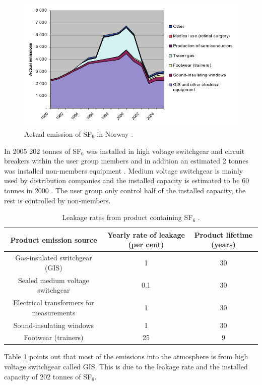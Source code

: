 \documentclass[10pt,a4paper]{article} %
\begin{document}
\begin{figure}[H]
\centering
\includegraphics[scale=0.6]{Bilder/Theory/emissionsSF6Norway.png}
\caption{Actual emission of SF$_6$ in Norway \cite{bib:StatSF6}.} \label{fig:SF6EmissNor}
\end{figure}

In 2005 202 tonnes of SF$_6$ was installed in high voltage switchgear and circuit breakers within the user group members and in addition an estimated 2 tonnes was installed non-members equipment \cite{bib:StatSF6}. Medium voltage switchgear is mainly used by distribution companies and the installed capacity is estimated to be 60 tonnes in 2000 \cite{bib:StatSF6}. The user group only control half of the installed capacity, the rest is controlled by non-members. 

\begin{table}[H]
\center
\caption{Leakage rates from product containing SF$_6$ \cite{bib:StatSF6}.}
\begin{tabular}{|c|c|c|}
\hline 
\textbf{Product emission source}
 & \textbf{Yearly rate of
leakage (per cent)}
 & \textbf{Product lifetime
(years)}
 \\ 
\hline 
Gas-insulated switchgear (GIS)
 & 1 & 30 \\ 
\hline 
Sealed medium voltage switchgear
 & 0.1 & 30 \\ 
\hline 
Electrical transformers for
measurements
 & 1 & 30 \\ 
\hline 
Sound-insulating windows
 & 1 & 30 \\ 
\hline 
Footwear (trainers)
 & 25 & 9 \\ 
\hline 
\end{tabular} 
\label{tab:leakageRatesProdSF6}
\end{table}
\newpage

Table \ref{tab:leakageRatesProdSF6} points out that most of the emissions into the atmosphere is from high voltage switchgear called GIS. This is due to the leakage rate and the installed capacity of 202 tonnes of SF$_6$.
\end{document}
